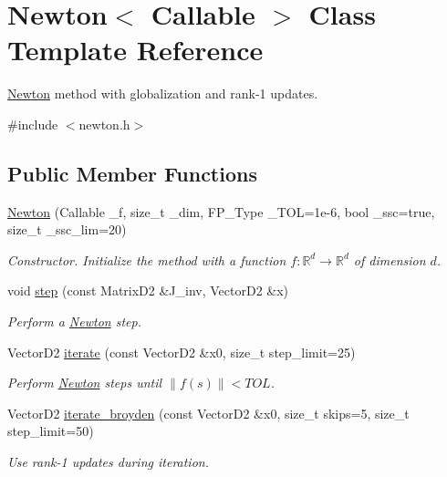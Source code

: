 \hypertarget{classNewton}{}\section{Newton$<$ Callable $>$ Class Template Reference}
\label{classNewton}


\hyperlink{classNewton}{Newton} method with globalization and rank-\/1 updates.  




{\ttfamily \#include $<$newton.\+h$>$}

\subsection*{Public Member Functions}
\begin{DoxyCompactItemize}
\item 
\hyperlink{classNewton_a8271deaf4a7dd62152c126fb506b8d9b}{Newton} (Callable \+\_\+f, size\+\_\+t \+\_\+dim, F\+P\+\_\+\+Type \+\_\+\+T\+OL=1e-\/6, bool \+\_\+ssc=true, size\+\_\+t \+\_\+ssc\+\_\+lim=20)
\begin{DoxyCompactList}\small\item\em Constructor. Initialize the method with a function $f:\mathbb{R}^d \rightarrow \mathbb{R}^d$ of dimension $d$. \end{DoxyCompactList}\item 
void \hyperlink{classNewton_a6331f82a3fb26379f95ac4dc82b2305f}{step} (const Matrix\+D2 \&J\+\_\+inv, Vector\+D2 \&x)
\begin{DoxyCompactList}\small\item\em Perform a \hyperlink{classNewton}{Newton} step. \end{DoxyCompactList}\item 
Vector\+D2 \hyperlink{classNewton_a39f58ddb9692d7eed4127e2d6f4616f3}{iterate} (const Vector\+D2 \&x0, size\+\_\+t step\+\_\+limit=25)
\begin{DoxyCompactList}\small\item\em Perform \hyperlink{classNewton}{Newton} steps until $\|f(s)\| < TOL$. \end{DoxyCompactList}\item 
Vector\+D2 \hyperlink{classNewton_a8040c553c7cb3adf19eba02a5afabdb0}{iterate\+\_\+broyden} (const Vector\+D2 \&x0, size\+\_\+t skips=5, size\+\_\+t step\+\_\+limit=50)
\begin{DoxyCompactList}\small\item\em Use rank-\/1 updates during iteration. \end{DoxyCompactList}\end{DoxyCompactItemize}


